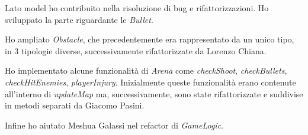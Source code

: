 Lato model ho contribuito nella risoluzione di bug e rifattorizzazioni.
Ho sviluppato la parte riguardante le \textit{Bullet}.

Ho ampliato \textit{Obstacle}, che precedentemente era rappresentato da un unico tipo, in 3 tipologie diverse, successivamente rifattorizzate da Lorenzo Chiana.

Ho implementato alcune funzionalità di \textit{Arena} come \textit{checkShoot}, \textit{checkBullets}, \textit{checkHitEnemies}, \textit{playerInjury}. Inizialmente queste funzionalità erano contenute all'interno di \textit{updateMap} ma, successivamente, sono state rifattorizzate e suddivise in metodi separati da Giacomo Pasini.

Infine ho aiutato Meshua Galassi nel refactor di \textit{GameLogic}.